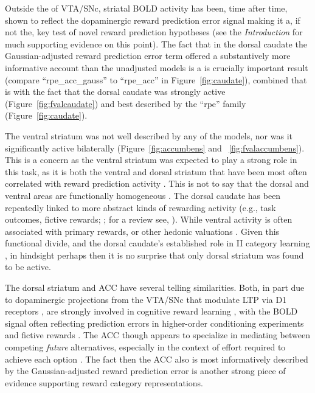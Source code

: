 \documentclass[doc,12pt]{apa}        %
\begin{document}
Outside the of VTA/SNc, striatal BOLD activity has been, time after time, shown to reflect the dopaminergic reward prediction error signal making it a, if not the, key test of novel reward prediction hypotheses (see the \emph{Introduction} for much supporting evidence on this point).  The fact that in the dorsal caudate the Gaussian-adjusted reward prediction error term offered a substantively more informative account than the unadjusted models is a is crucially important result (compare ``rpe\_acc\_gauss'' to ``rpe\_acc'' in Figure~\ref{fig:caudate}), combined that is with the fact that the dorsal caudate was strongly active (Figure~\ref{fig:fvalcaudate}) and best described by the ``rpe'' family (Figure~\ref{fig:caudate}).  
 
The ventral striatum was not well described by any of the models, nor was it significantly active bilaterally (Figure~\ref{fig:accumbens} and ~\ref{fig:fvalaccumbens}).  This is a concern as the ventral striatum was expected to play a strong role in this task, as it is both the ventral and dorsal striatum that have been most often correlated with reward prediction activity \cite{ODoherty:2003p6329,Knutson:2007p1687,Schonberg:2007p518}.  This is not to say that the dorsal and ventral areas are functionally homogeneous \cite{Schonberg:2009p6669,ODoherty:2004p1269,Atallah:2007p1746}.  The dorsal caudate has been repeatedly linked to more abstract kinds of rewarding activity (e.g., task outcomes, fictive rewards; ; for a review see, ).  While ventral activity is  often associated with primary rewards, or other hedonic valuations \cite{ODoherty:2004p1269}.  Given this functional divide, and the dorsal caudate's established role in II category learning \cite{Ashby:1998p9716}, in hindsight perhaps then it is no surprise that only dorsal striatum was found to be active.

The dorsal striatum and ACC have several telling similarities.  Both, in part due to dopaminergic projections from the VTA/SNc that modulate LTP via D1 receptors \cite{Schweimer:2006p9780}, are strongly involved in cognitive reward learning \cite{Atlas:2010p7566,Hayden:2009p6545,Rudebeck:2008p4712,Rolls:2008p7577,Quilodran:2008p2645,Hampton:2007p2983,Ernst:2004p3998}, with the BOLD signal often reflecting prediction errors in higher-order conditioning experiments \cite{seymour:2004aa} and fictive rewards \cite{Hayden:2009p6545}.  The ACC though appears to specialize in mediating between competing \emph{future} alternatives, especially in the context of effort required to achieve each option \cite{Quilodran:2008p2645}.  The fact then the ACC also is most informatively described by the Gaussian-adjusted reward prediction error is another strong piece of evidence supporting reward category representations.  
\end{document}
